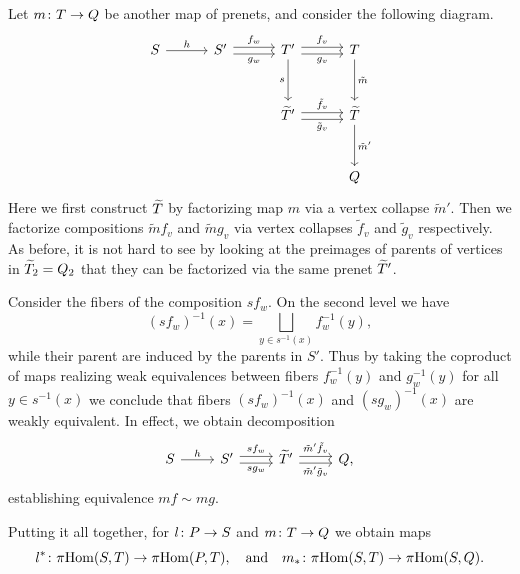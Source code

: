 \documentclass[letterpaper,12pt,leqno]{article}
\numberwithin{equation}{theorem}
\begin{document}
Let $m\colon T \to Q$ be another map of prenets, and consider the following diagram.
\begin{equation}
\label{equ_piHom_push}
\begin{tikzcd}[sep=3em]
S \ar[r, "h"] & S' \ar[shift left, r, "f_w"] \ar[shift right, r, "g_w"'] & T' \ar[d, "s"'] \ar[shift left, r, "f_v"] \ar[shift right, r, "g_v"'] & T \ar[d, "\tilde m"] \\
& & \wtilde T' \ar[shift left, r, "\tilde f_v"] \ar[shift right, r, "\tilde g_v"'] & \wtilde T \ar[d, "\tilde m'"] \\
& & & Q
\end{tikzcd}
\end{equation}
Here we first construct $\widetilde T$ by factorizing map $m$ via a vertex collapse $\tilde m'$. Then we factorize compositions $\tilde m f_v$ and $\tilde m g_v$ via vertex
collapses $\tilde f_v$ and $\tilde g_v$ respectively. As before, it is not hard to see by looking at the preimages of parents of vertices in $\widetilde T_2 = Q_2$
that they can be factorized via the same prenet $\widetilde T'$.

Consider the fibers of the composition $s f_w$. On the second level we have
$$
(sf_w)^{-1}(x) = \bigsqcup_{y \in s^{-1}(x)} f_w^{-1}(y),
$$
while their parent are induced by the parents in $S'$. Thus by taking the coproduct of maps realizing weak equivalences between fibers $f_w^{-1}(y)$ and $g_w^{-1}(y)$ for all $y \in s^{-1}(x)$
we conclude that fibers $(sf_w)^{-1}(x)$ and $(sg_w)^{-1}(x)$ are weakly equivalent. In effect, we obtain decomposition
$$
\begin{tikzcd}
S \ar[r, "h"] & S' \ar[shift left, r, "sf_w"] \ar[shift right, r, "sg_w"'] & \wtilde T' \ar[shift left, r, "\tilde m'\tilde f_v"] \ar[shift right, r, "\tilde m' \tilde g_v"'] & Q,
\end{tikzcd}
$$
establishing equivalence $mf \sim mg$.

Putting it all together, for $l\colon P \to S$ and $m\colon T \to Q$ we obtain maps
\begin{equation}
\label{equ_piHom_cat}
l^*\colon \pi\mathrm{Hom}(S, T) \to \pi\mathrm{Hom}(P, T), \quad \text{and} \quad m_*\colon \pi\mathrm{Hom}(S, T) \to \pi\mathrm{Hom}(S, Q).
\end{equation}
\end{document}
